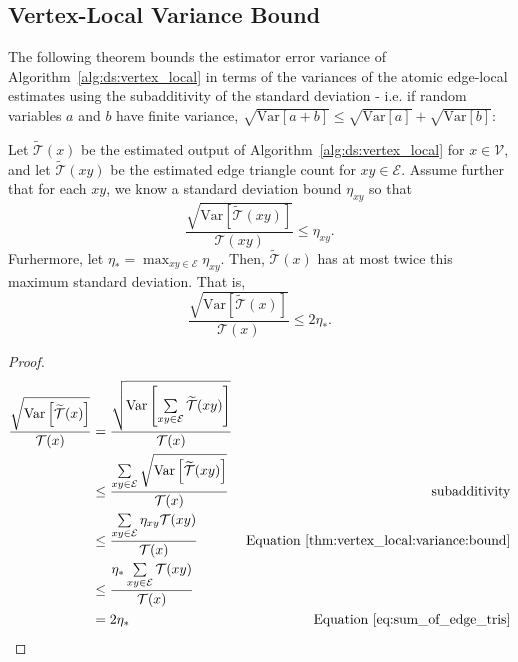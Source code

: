 \documentclass{vldb}
\newcommand{\Var}{\mathrm{Var}}
\begin{document}
\begin{appendix}

\section{Vertex-Local Variance Bound}
\label{apdx:bound}

The following theorem bounds the estimator error variance of Algorithm~\ref{alg:ds:vertex_local} in terms of the variances of the atomic edge-local estimates using the subadditivity of the standard deviation - i.e. if random variables $a$ and $b$ have finite variance, $\sqrt{\Var \left [ a + b\right ]} \leq \sqrt{\Var \left [ a\right ]} + \sqrt{\Var \left [ b\right ]}$:

\begin{theorem} \label{thm:vertex_local:variance}
	Let $\widetilde{\mathcal{T}}(x)$ be the estimated output of Algorithm~\ref{alg:ds:vertex_local} for $x \in \mathcal{V}$, and let $\widetilde{\mathcal{T}}(xy)$ be the estimated edge triangle count for $xy \in \mathcal{E}$.
	Assume further that for each $xy$, we know a standard deviation bound $\eta_{xy}$ so that
	\begin{equation} \label{thm:vertex_local:variance:bound}
		\frac{\sqrt{\Var \left [ \widetilde{\mathcal{T}}(xy) \right ] }}{\mathcal{T}(xy)} \leq \eta_{xy}.
	\end{equation}
	Furhermore, let $\eta_{*} = \max_{xy \in \mathcal{E}} \eta_{xy}$.
	Then, $\widetilde{\mathcal{T}}(x)$ has at most twice this maximum standard deviation.
	That is,
	\begin{equation*}
		\frac{\sqrt{\Var \left [ \widetilde{\mathcal{T}}(x) \right ] }}{\mathcal{T}(x)} \leq 2\eta_{*}.
	\end{equation*}
\end{theorem}

\begin{proof}
\begin{align*}
	\frac{\sqrt{\Var \left [ \widetilde{\mathcal{T}}(x) \right ] }}{\mathcal{T}(x)}
	&=
	\frac{\sqrt{\Var \left [ \sum\limits_{xy \in \mathcal{E}} \widetilde{\mathcal{T}}(xy) \right ] }}{\mathcal{T}(x)}
	& \\
	&\leq
	\frac{\sum\limits_{xy \in \mathcal{E}} \sqrt{\Var \left [ \widetilde{\mathcal{T}}(xy) \right ] }}{\mathcal{T}(x)}
	& \textnormal{subadditivity} \\
	&\leq
	\frac{\sum\limits_{xy \in \mathcal{E}} \eta_{xy} \mathcal{T}(xy)}{\mathcal{T}(x)}
	& \textnormal{Equation~\eqref{thm:vertex_local:variance:bound}}  \\
	&\leq
	\frac{\eta_* \sum\limits_{xy \in \mathcal{E}} \mathcal{T}(xy)}{\mathcal{T}(x)}
	&  \\
	&=
	2\eta_*
	&  \textnormal{Equation~\eqref{eq:sum_of_edge_tris}}\\
\end{align*}
\end{proof}


\end{appendix}
\end{document}
